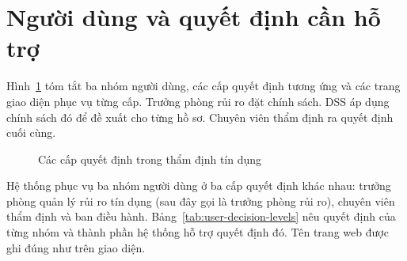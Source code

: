 \section{Người dùng và quyết định cần hỗ trợ}
\label{sec:users}

Hình~\ref{fig:decision_levels} tóm tắt ba nhóm người dùng, các cấp quyết định tương ứng và các trang giao diện phục vụ từng cấp. Trưởng phòng rủi ro đặt chính sách. DSS áp dụng chính sách đó để đề xuất cho từng hồ sơ. Chuyên viên thẩm định ra quyết định cuối cùng.

\begin{figure}[H]
	\centering
	\caption{Các cấp quyết định trong thẩm định tín dụng}
	\label{fig:decision_levels}
\end{figure}

Hệ thống phục vụ ba nhóm người dùng ở ba cấp quyết định khác nhau: trưởng phòng quản lý rủi ro tín dụng (sau đây gọi là trưởng phòng rủi ro), chuyên viên thẩm định và ban điều hành. Bảng~\ref{tab:user-decision-levels} nêu quyết định của từng nhóm và thành phần hệ thống hỗ trợ quyết định đó. Tên trang web được ghi đúng như trên giao diện.

